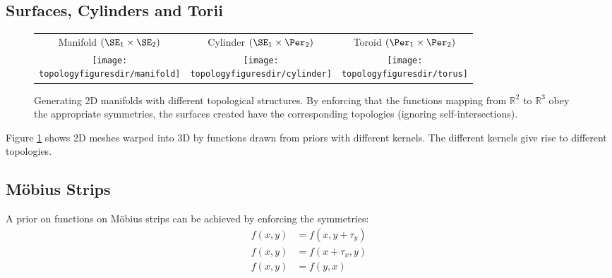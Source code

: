 \subsection{Surfaces, Cylinders and Torii}

\begin{figure}
\renewcommand{\tabcolsep}{1mm}
\begin{tabular}{ccc}
Manifold $( \SE_1 \times \SE_2 )$  & Cylinder $( \SE_1 \times \Per_2 )$ & Toroid $( \Per_1 \times \Per_2 )$\\
\hspace{-0.5cm}\texttt{[image: \\topologyfiguresdir/manifold]} &
\texttt{[image: \\topologyfiguresdir/cylinder]} &
\texttt{[image: \\topologyfiguresdir/torus]} \\
\end{tabular}
\caption[Generating 2D manifolds with different topological structures]{
Generating 2D manifolds with different topological structures.
By enforcing that the functions mapping from $\mathbb{R}^2$ to $\mathbb{R}^3$ obey the appropriate symmetries, the surfaces created have the corresponding topologies (ignoring self-intersections).
}
\label{fig:gen_surf}
\end{figure}

Figure \ref{fig:gen_surf} shows 2D meshes warped into 3D by functions drawn from \gp{} priors with different kernels.
The different kernels give rise to different topologies.


\subsection{M\"{o}bius Strips}

A prior on functions on M\"{o}bius strips can be achieved by enforcing the symmetries:
%
\begin{align}
f(x, y) & = f( x, y + \tau_y) \\
f(x, y) & = f( x + \tau_x, y)  \\
f(x, y) & = f( y, x )
\end{align}

